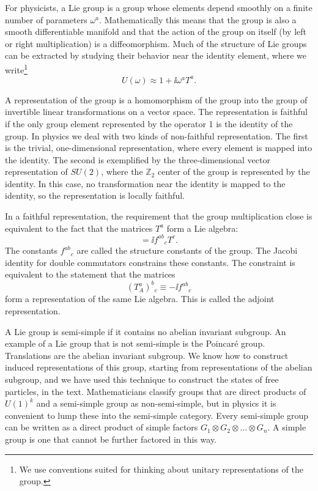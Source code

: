 
For physicists, a Lie group is a group whose elements depend smoothly on a
finite number of parameters $\omega^a$. Mathematically this means that the
group is also a smooth differentiable manifold and that the action of the
group on itself (by left or right multiplication) is a diffeomorphism. Much of
the structure of Lie groups can be extracted by studying their behavior near
the identity element, where we write\footnote[1]{We use conventions suited for
thinking about unitary representations of the group.}
\begin{equation*}
  U(\omega)\approx 1+\ii\omega^aT^a.
\end{equation*}

A representation of the group is a homomorphism of the group into the group of
invertible linear transformations on a vector space. The representation is
faithful if the only group element represented by the operator 1 is the
identity of the group. In physics we deal with two kinds of non-faithful
representation. The first is the trivial, one-dimensional representation,
where every element is mapped into the identity. The second is exemplified by
the three-dimensional vector representation of $SU(2)$, where the $\mathbb Z_2$
center of the group is represented by the identity. In this case, no
transformation near the identity is mapped to the identity, so the
representation is locally faithful.

In a faithful representation, the requirement that the group multiplication
close is equivalent to the fact that the matrices $T^a$ form a Lie algebra:
\begin{equation*}
  [T^a,T^b]=\ii f^{ab}{}_{c}T^c.
\end{equation*}
The constants $f^{ab}{}_{c}$ are called the structure constants of the group.
The Jacobi identity for double commutators constrains these constants. The
constraint is equivalent to the statement that the matrices
\begin{equation*}
  (T_A^a)^b{}_{c}\equiv-\ii f^{ab}{}_{c}
\end{equation*}
form a representation of the same Lie algebra. This is called the adjoint
representation.

A Lie group is semi-simple if it contains no abelian invariant subgroup. An
example of a Lie group that is not semi-simple is the Poincaré group.
Translations are the abelian invariant subgroup. We know how to construct
induced representations of this group, starting from representations of the
abelian subgroup, and we have used this technique to construct the states of
free particles, in the text. Mathematicians classify groups that are direct
products of $U(1)^k$ and a semi-simple group as non-semi-simple, but in physics
it is convenient to lump these into the semi-simple category. Every
semi-simple group can be written as a direct product of simple factors
$G_1\otimes G_2\otimes\ldots\otimes G_n$. A simple group is one that cannot
be further factored in this way.

